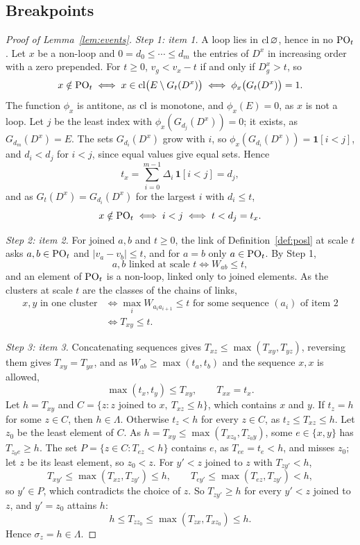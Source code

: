 \subsection{Breakpoints}
\label{app:events}

\begin{proof}[Proof of Lemma~\ref{lem:events}]
\emph{Step 1: item 1.}  A loop lies in $\operatorname{cl}\varnothing$, hence in no $\mathrm{PO}_t$.
Let $x$ be a non-loop and $0=d_0\le\cdots\le d_m$ the entries of $D^{x}$ in
increasing order with a zero prepended.  For $t\ge0$, $v_g<v_x-t$ if and only if
$D^{x}_g>t$, so
\[
  x\notin\mathrm{PO}_t\iff x\in\operatorname{cl}\bigl(E\setminus G_t(D^{x})\bigr)\iff\phi_x\bigl(G_t(D^{x})\bigr)=1.
\]
The function $\phi_x$ is antitone, as $\operatorname{cl}$ is monotone, and $\phi_x(E)=0$, as $x$ is
not a loop.  Let $j$ be the least index with $\phi_x(G_{d_j}(D^{x}))=0$; it exists,
as $G_{d_m}(D^{x})=E$.  The sets $G_{d_i}(D^{x})$ grow with $i$, so
$\phi_x(G_{d_i}(D^{x}))=\mathbf 1[i<j]$, and $d_i<d_j$ for $i<j$, since equal values
give equal sets.  Hence
\[
  t_x=\sum_{i=0}^{m-1}\Delta_i\,\mathbf 1[i<j]=d_j,
\]
and as $G_t(D^{x})=G_{d_i}(D^{x})$ for the largest $i$ with $d_i\le t$,
\[
  x\notin\mathrm{PO}_t\iff i<j\iff t<d_j=t_x.
\]

\emph{Step 2: item 2.}  For joined $a,b$ and $t\ge0$, the link of
Definition~\ref{def:posl} at scale $t$ asks $a,b\in\mathrm{PO}_t$ and $|v_a-v_b|\le t$, and
for $a=b$ only $a\in\mathrm{PO}_t$.  By Step 1,
\[
  a,b\text{ linked at scale }t\iff W_{ab}\le t,
\]
and an element of $\mathrm{PO}_t$ is a non-loop, linked only to joined elements.  As the
clusters at scale $t$ are the classes of the chains of links,
\[
  \begin{aligned}
  x,y\text{ in one cluster}
  &\iff\max_iW_{a_ia_{i+1}}\le t\text{ for some sequence }(a_i)\text{ of item 2}\\
  &\iff T_{xy}\le t.
  \end{aligned}
\]

\emph{Step 3: item 3.}  Concatenating sequences gives
$T_{xz}\le\max(T_{xy},T_{yz})$, reversing them gives $T_{xy}=T_{yx}$, and as
$W_{ab}\ge\max(t_a,t_b)$ and the sequence $x,x$ is allowed,
\[
  \max(t_x,t_y)\le T_{xy},\qquad T_{xx}=t_x.
\]
Let $h=T_{xy}$ and $C=\{z:z\text{ joined to }x,\ T_{xz}\le h\}$, which contains $x$
and $y$.  If $t_z=h$ for some $z\in C$, then $h\in\Lambda$.  Otherwise $t_z<h$ for
every $z\in C$, as $t_z\le T_{xz}\le h$.  Let $z_0$ be the least element of $C$.  As
$h=T_{xy}\le\max(T_{xz_0},T_{z_0y})$, some $e\in\{x,y\}$ has $T_{z_0e}\ge h$.  The set
$P=\{z\in C:T_{ez}<h\}$ contains $e$, as $T_{ee}=t_e<h$, and misses $z_0$; let $z$ be
its least element, so $z_0<z$.  For $y'<z$ joined to $z$ with $T_{zy'}<h$,
\[
  T_{xy'}\le\max(T_{xz},T_{zy'})\le h,\qquad T_{ey'}\le\max(T_{ez},T_{zy'})<h,
\]
so $y'\in P$, which contradicts the choice of $z$.  So $T_{zy'}\ge h$ for every
$y'<z$ joined to $z$, and $y'=z_0$ attains $h$:
\[
  h\le T_{zz_0}\le\max(T_{zx},T_{xz_0})\le h.
\]
Hence $\sigma_z=h\in\Lambda$.


\end{proof}
